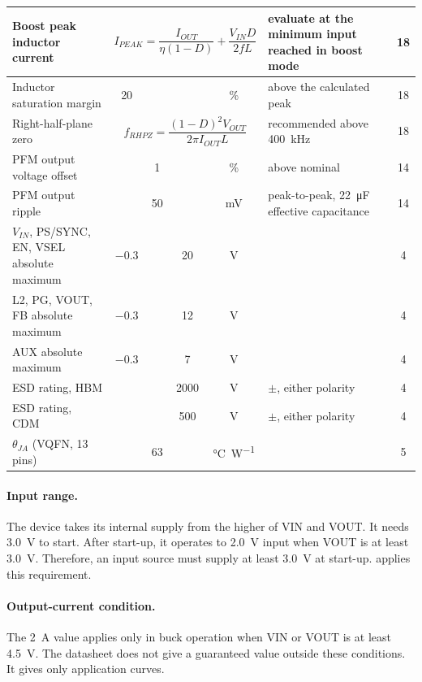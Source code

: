 {\begin{longtable}{|L{4.4cm}|c|c|c|c|L{3.6cm}|c|}
\hline
Boost peak inductor current &  & evaluate at the minimum input reached in boost mode & 18 \\
\hline
Inductor saturation margin & \num{20} & & & \% & above the calculated peak & 18 \\
\hline
Right-half-plane zero &  & recommended above \SI{400}{\kilo\hertz} & 18 \\
\hline
PFM output voltage offset & & \num{1} & & \% & above nominal & 14 \\
\hline
PFM output ripple & & \num{50} & & \si{\milli\volt} & peak-to-peak, \SI{22}{\micro\farad} effective capacitance & 14 \\
\hline
\(V_{IN}\), PS/SYNC, EN, VSEL absolute maximum & \num{-0.3} & & \num{20} & \si{\volt} & & 4 \\
\hline
L2, PG, VOUT, FB absolute maximum & \num{-0.3} & & \num{12} & \si{\volt} & & 4 \\
\hline
AUX absolute maximum & \num{-0.3} & & \num{7} & \si{\volt} & & 4 \\
\hline
ESD rating, HBM & & & \num{2000} & \si{\volt} & $\pm$, either polarity & 4 \\
\hline
ESD rating, CDM & & & \num{500} & \si{\volt} & $\pm$, either polarity & 4 \\
\hline
\(\theta_{JA}\) (VQFN, 13 pins) & & \num{63} & & \si{\celsius\per\watt} & & 5 \\
\hline
\end{longtable}
}

\paragraph{Input range.} The device takes its internal supply from the higher
of VIN and VOUT. It needs \SI{3.0}{\volt} to start. After start-up, it operates
to \SI{2.0}{\volt} input when VOUT is at least \SI{3.0}{\volt}. Therefore, an
input source must supply at least \SI{3.0}{\volt} at start-up.
 applies this requirement.

\paragraph{Output-current condition.} The \SI{2}{\ampere} value applies only in
buck operation when VIN or VOUT is at least \SI{4.5}{\volt}. The datasheet does
not give a guaranteed value outside these conditions. It gives only application
curves.

